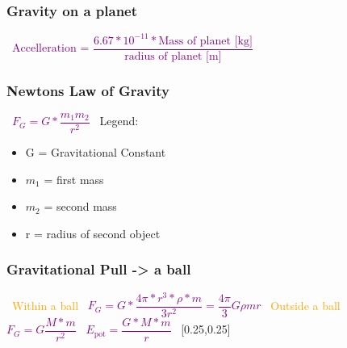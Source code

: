 \documentclass[main.tex,fontsize=8pt,paper=a4,paper=portrait,DIV=calc,]{scrartcl}
\begin{document}
\begin{multicols*}{2}
\subsubsection{Gravity on a planet}
\, \newline
\large \textcolor{purple}{\( \text{Accelleration = }\dfrac{6.67 * 10^{-11}* \text{Mass of planet [kg]}} {\text{radius of planet [m]}} \)}\newline
\, \newline
\normalsize 

\subsubsection{Newtons Law of Gravity}
\, \newline
\large \textcolor{purple}{\( F_G = G * \dfrac{m_1m_2}{r^2} \)}\newline
\, \newline
\normalsize Legend: \newline
\begin{itemize}
\item G = Gravitational Constant
\item \(m_1\) = first mass
\item \(m_2\) = second mass
\item r = radius of second object 
\end{itemize} 


\subsubsection{Gravitational Pull -> a ball}
\, \newline
\textcolor{orange}{Within a ball}\newline
\, \newline
\large \textcolor{purple}{\( F_G = G * \dfrac{4 \pi * r^3 * \rho * m}{3r^2} = \dfrac{4 \pi}{3}G \rho m r \)}\newline
\, \newline
\textcolor{orange}{Outside a ball}\newline
\, \newline
\large \textcolor{purple}{\( F_G = G \dfrac{M * m}{r^2} \)}\newline
\, \newline
\large \textcolor{purple}{\( E_{\text{pot}} = \dfrac{G * M * m}{r} \)}\newline
\, \newline
\normalsize 
{}[0.25,0.25]


\end{multicols*}
\end{document}
